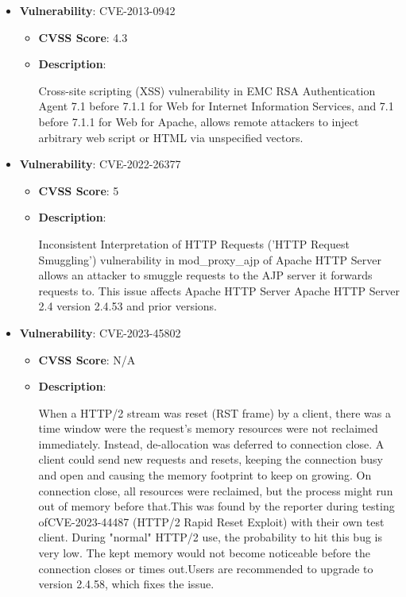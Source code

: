 \documentclass{article}
\begin{document}
\begin{itemize}
        \item \textbf{Vulnerability}: CVE-2013-0942
        \begin{itemize}
            \item \textbf{CVSS Score}:  4.3 
            \item \textbf{Description}:
            \parbox[t]{0.9\linewidth}{
                \ttfamily Cross-site scripting (XSS) vulnerability in EMC RSA Authentication Agent 7.1 before 7.1.1 for Web for Internet Information Services, and 7.1 before 7.1.1 for Web for Apache, allows remote attackers to inject arbitrary web script or HTML via unspecified vectors.
            }
        \end{itemize}
    
        \item \textbf{Vulnerability}: CVE-2022-26377
        \begin{itemize}
            \item \textbf{CVSS Score}:  5 
            \item \textbf{Description}:
            \parbox[t]{0.9\linewidth}{
                \ttfamily Inconsistent Interpretation of HTTP Requests ('HTTP Request Smuggling') vulnerability in mod\_proxy\_ajp of Apache HTTP Server allows an attacker to smuggle requests to the AJP server it forwards requests to. This issue affects Apache HTTP Server Apache HTTP Server 2.4 version 2.4.53 and prior versions.
            }
        \end{itemize}
    
        \item \textbf{Vulnerability}: CVE-2023-45802
        \begin{itemize}
            \item \textbf{CVSS Score}:  N/A 
            \item \textbf{Description}:
            \parbox[t]{0.9\linewidth}{
                \ttfamily When a HTTP/2 stream was reset (RST frame) by a client, there was a time window were the request's memory resources were not reclaimed immediately. Instead, de-allocation was deferred to connection close. A client could send new requests and resets, keeping the connection busy and open and causing the memory footprint to keep on growing. On connection close, all resources were reclaimed, but the process might run out of memory before that.This was found by the reporter during testing ofCVE-2023-44487 (HTTP/2 Rapid Reset Exploit) with their own test client. During "normal" HTTP/2 use, the probability to hit this bug is very low. The kept memory would not become noticeable before the connection closes or times out.Users are recommended to upgrade to version 2.4.58, which fixes the issue.
            }
        \end{itemize}
    

\end{itemize}
\end{document}
